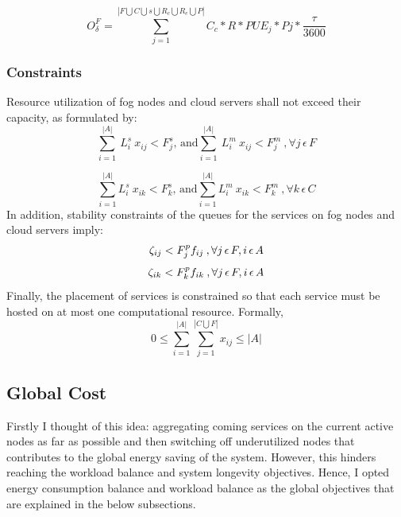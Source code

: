 \documentclass[twocolumn]{article}
\begin{document}
\begin{equation}
O^{F}_{\delta} = \sum_{j=1}^{|F \bigcup C \bigcup {s} \bigcup R_{c} \bigcup R_{e} \bigcup P|} C_{c}*R*PUE_{j}*P{j}* \frac{\tau}{3600}
\label{eq:27}
\end{equation}

\subsubsection{Constraints}
\par Resource utilization of fog nodes and cloud servers shall not exceed their capacity, as formulated by:
\begin{equation}
\sum_{i=1}^{|A|} \ L_{i}^{s} \ x_{ij}<F_{j}^{s}\text{, and} \sum_{i=1}^{|A|} \ L_{i}^{m} \ x_{ij}<F_{j}^{m} \:,\forall j\,\epsilon\,F
\label{eq:28}
\end{equation}

\begin{equation}
\sum_{i=1}^{|A|} L_{i}^{s} \ x_{ik}<F_{k}^{s}\text{, and} \sum_{i=1}^{|A|} L_{i}^{m} \ x_{ik}<F_{k}^{m}\:,\forall k\,\epsilon\,C
\label{eq:29}
\end{equation}
In addition, stability constraints of the queues for the services on fog nodes and cloud servers imply:
\begin{equation}
\zeta_{ij}<F_{j}^{p}  f_{ij}\:,\forall j\,\epsilon\,F , i\,\epsilon\,A 
\label{eq:30}\\
\end{equation}
\begin{equation}
\zeta_{ik}<F_{k}^{p}  f_{ik} \:,\forall j\,\epsilon\,F , i\,\epsilon\,A 
\label{eq:31}\\
\end{equation}
Finally, the placement of services is constrained so that each service must be hosted on at most one computational resource. Formally,
\begin{equation}
0\leq \sum_{i=1}^{|A|}\sum_{j=1}^{|{C}\bigcup{F}|}x_{ij}\leq |A|
\label{eq:32}
\end{equation}

\subsection{Global Cost}
\par Firstly I thought of this idea: aggregating coming services on the current active nodes as far as possible and then switching off underutilized nodes that contributes to the global energy saving of the system. However, this hinders reaching the workload balance and system longevity objectives. Hence, I opted energy consumption balance and workload balance as the global objectives that are explained in the below subsections.
\end{document}
